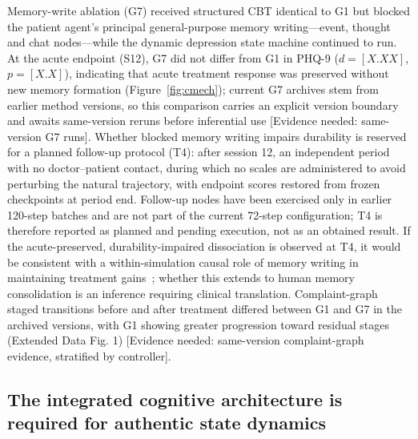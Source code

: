 \documentclass[sn-nature,pdflatex]{sn-jnl}
\begin{document}
Memory-write ablation (G7) received structured CBT identical to G1 but blocked the patient agent's principal general-purpose memory writing---event, thought and chat nodes---while the dynamic depression state machine continued to run. At the acute endpoint (S12), G7 did not differ from G1 in PHQ-9 ($d = [X.XX]$, $p = [X.X]$), indicating that acute treatment response was preserved without new memory formation (Figure~\ref{fig:cmech}); current G7 archives stem from earlier method versions, so this comparison carries an explicit version boundary and awaits same-version reruns before inferential use [Evidence needed: same-version G7 runs]. Whether blocked memory writing impairs durability is reserved for a planned follow-up protocol (T4): after session 12, an independent period with no doctor--patient contact, during which no scales are administered to avoid perturbing the natural trajectory, with endpoint scores restored from frozen checkpoints at period end. Follow-up nodes have been exercised only in earlier 120-step batches and are not part of the current 72-step configuration; T4 is therefore reported as planned and pending execution, not as an obtained result. If the acute-preserved, durability-impaired dissociation is observed at T4, it would be consistent with a within-simulation causal role of memory writing in maintaining treatment gains~\cite{teasdale1988,spens2024}; whether this extends to human memory consolidation is an inference requiring clinical translation. Complaint-graph staged transitions before and after treatment differed between G1 and G7 in the archived versions, with G1 showing greater progression toward residual stages (Extended Data Fig. 1) [Evidence needed: same-version complaint-graph evidence, stratified by controller].

\subsection*{The integrated cognitive architecture is required for authentic state dynamics}
\end{document}
